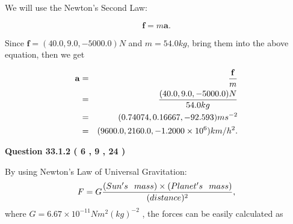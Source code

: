 \documentclass[12pt]{article}
\begin{document}
 

We will use the Newton's Second Law:
 
\[
\mathbf{f}=m\mathbf{a}.
\]
 
Since $\mathbf{f}=( %
40.0,  %
9.0,  %
-5000.0 )N$
and $m= %
54.0 kg$, bring them into the above equation, then we get
 
\begin{eqnarray*}
\mathbf{a}&=&\frac{\mathbf{f}}m  \\
&=&\frac{(
40.0 ,
9.0 ,
-5000.0 )N
}{ %
54.0 kg}  \\
&=&(
0.74074 ,
0.16667,
-92.593
)ms^{-2} \\
&=&(
9600.0 ,
2160.0 ,
-1.2000 \times 10^{6}
)km/h^2.
\end{eqnarray*}
 
 
 
  
\vspace{0.2in}
  
{\textbf{\Large{Question
33.1.2 
 (           6 ,           9 ,          24 )
}}}
  
  
 
 

By using Newton's Law of Universal Gravitation:
\[
F=G \frac{(Sun's \hspace{0.1in} mass) \times (Planet's \hspace{0.1in} mass)} { (distance)^2},
\]
where
$ G= %
6.67 \times 10^{-11}N m^{2}(kg)^{-2}$ , the forces can be easily calculated as
 
\vspace{0.2in}
 
\end{document}
